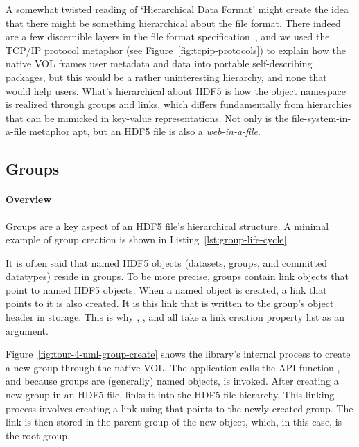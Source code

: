 

A somewhat twisted reading of `Hierarchical Data Format' might create the idea that there might be something hierarchical about the file format. There indeed are a few discernible layers in the file format specification~\cite{ffmt}, and we used the TCP/IP protocol metaphor (see Figure~\ref{fig:tcpip-protocols}) to explain how the native VOL frames user metadata and data into portable self-describing packages, but this would be a rather uninteresting hierarchy, and none that would help users. What's hierarchical about HDF5 is how the object namespace is realized through groups and links, which differs fundamentally from hierarchies that can be mimicked in key-value representations. Not only is the file-system-in-a-file metaphor apt, but an HDF5 file is also a \textit{web-in-a-file}.

\subsection{Groups}

\paragraph{Overview} Groups are a key aspect of an HDF5 file's hierarchical structure. A minimal example of group creation is shown in Listing~\ref{lst:group-life-cycle}.

It is often said that named HDF5 objects (datasets, groups, and committed datatypes) reside in groups. To be more precise, groups contain link objects that point to named HDF5 objects. When a named object is created, a link that points to it is also created. It is this link that is written to the group's object header in storage. This is why , , and  all take a link creation property list as an argument.

Figure~\ref{fig:tour-4-uml-group-create} shows the library's internal process to create a new group through the native VOL. The application calls the API function , and because groups are (generally) named objects,  is invoked. After creating a new group in an HDF5 file,  links it into the HDF5 file hierarchy. This linking process involves creating a link using  that points to the newly created group. The link is then stored in the parent group of the new object, which, in this case, is the root group.


